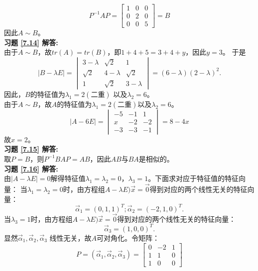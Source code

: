 \begin{equation*}
P^{-1}AP=\begin{bmatrix}
  1&0&0\\
  0&2&0\\
  0&0&5
\end{bmatrix}=B
\end{equation*}
因此$A\sim B$。\\
\textbf{习题 \ref{7.14} 解答:}\\
由于$A\sim B$，故$tr(A)=tr(B)$，即$1+4+5=3+4+y$，因此$y=3$。
于是
\begin{equation*}
|B-\lambda E|=\begin{vmatrix}3-\lambda&\sqrt{2}&1\\ \sqrt{2}&4-\lambda&\sqrt{2}\\1&\sqrt{2}&3-\lambda\end{vmatrix}
=(6-\lambda)(2-\lambda)^2.
\end{equation*}
因此，$B$的特征值为$\lambda_1=2(\text{二重})$ 以及$\lambda_2=6$。\\
由于$A\sim B$，故$A$的特征值为$\lambda_1=2(\text{二重})$以及$\lambda_2=6$。
\begin{equation*}
  |A-6E|=\begin{vmatrix}-5&-1&1\\x&-2&-2\\-3&-3&-1\end{vmatrix}=8-4x
\end{equation*}
故$x=2$。\\
\textbf{习题 \ref{7.15} 解答:}\\
取$P=B$，则$P^{-1}BAP=AB$，因此$AB$与$BA$是相似的。\\
\textbf{习题 \ref{7.16} 解答:}\\
由$|A-\lambda E|=0$解得特征值$\lambda_1=\lambda_2=0$，$\lambda_3=1$。下面求对应于特征值的特征向量：
当$\lambda_1=\lambda_2=0$时，由方程组$A-\lambda E)\vec{x}=\vec{0}$得到对应的两个线性无关的特征向量：
\begin{equation}
  \vec{\alpha}_1=(0,1,1)^T;\vec{\alpha}_2=(-2,1,0)^T.
\end{equation}
当$\lambda_3=1$时，由方程组$A-\lambda E)\vec{x}=\vec{0}$得到对应的两个线性无关的特征向量：
\begin{equation}
  \vec{\alpha}_3=(1,0,0)^T.
\end{equation}
显然$\vec{\alpha}_1,\vec{\alpha}_2,\vec{\alpha}_3$ 线性无关，故$A$可对角化。令矩阵：
\begin{equation*}
 P=(\vec{\alpha}_1,\vec{\alpha}_2,\vec{\alpha}_3)=\begin{bmatrix}0&-2&1\\1&1&0\\1&0&0\end{bmatrix}
\end{equation*}
